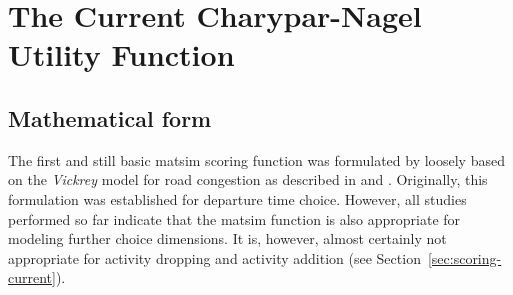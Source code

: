 \section{The Current Charypar-Nagel Utility Function}
\label{sec:charyparnagel}
\subsection{Mathematical form}
\label{sec:mathematical-form}

The first and still basic \gls{matsim} scoring function was formulated by \citet[][]{CharyparNagel2005ga4acts} loosely based on the \emph{Vickrey} model for road congestion as described in \citet[][]{Vickrey_TAER_1969} and \citet[][]{ArnottEtAl_TAER_1993}. Originally, this formulation was established for departure time choice. However, all studies performed so far indicate that the \gls{matsim} function is also appropriate for modeling 
further choice dimensions.
%
It is, however, almost certainly not appropriate for activity dropping and activity addition (see Section~\ref{sec:scoring-current}).




